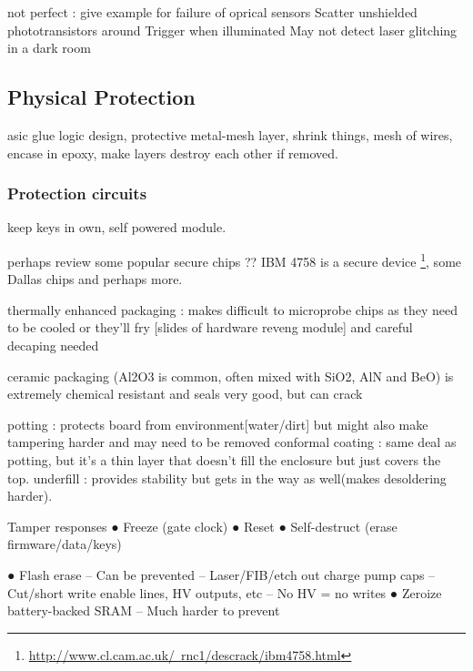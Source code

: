 not perfect : give example for failure of oprical sensors
Scatter unshielded phototransistors around
Trigger when illuminated
May not detect laser glitching in a dark room

\subsection{Physical Protection}
asic glue logic design, protective metal-mesh layer, shrink things, mesh of wires, encase in epoxy, make layers destroy each other if removed. 
\subsubsection{Protection circuits}
 keep keys in own, self powered module.
	
	perhaps review some popular secure chips ?? IBM 4758 is a secure device \footnote{\href{http://www.cl.cam.ac.uk/~rnc1/descrack/ibm4758.html}{http://www.cl.cam.ac.uk/~rnc1/descrack/ibm4758.html}}, some Dallas chips and perhaps more.
	
	thermally enhanced packaging : makes difficult to microprobe chips as they need to be cooled or they'll fry [slides of hardware reveng module] and careful decaping needed
	
	ceramic packaging (Al2O3 is common, often mixed with SiO2, AlN and BeO) is extremely chemical resistant and seals very good, but can crack
	
	potting : protects board from environment[water/dirt] but might also make tampering harder and may need to be removed
	conformal coating : same deal as potting, but it's a thin layer that doesn't fill the enclosure but just covers the top.
	underfill : provides stability but gets in the way as well(makes desoldering harder).


Tamper responses
● Freeze (gate clock)
● Reset
● Self-destruct (erase firmware/data/keys)

● Flash erase
– Can be prevented
– Laser/FIB/etch out charge pump caps
– Cut/short write enable lines, HV outputs, etc
– No HV = no writes
● Zeroize battery-backed SRAM
– Much harder to prevent